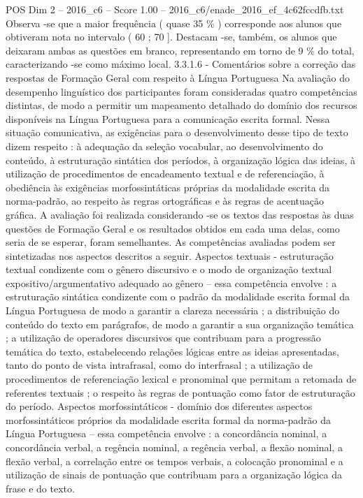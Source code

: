 \begin{textsample}{POS Dim 2 – 2016\_c6 – Score 1.00 – 2016\_c6/enade\_2016\_ef\_4c62fccdfb.txt}
Observa -se que a maior frequência ( quase 35 \% ) corresponde aos alunos que obtiveram nota no intervalo ( 60 ; 70 ].
Destacam -se, também, os alunos que deixaram ambas as questões em branco, representando em torno de 9 \% do total, caracterizando -se como máximo local. 3.3.1.6 - Comentários sobre a correção das respostas de Formação Geral com respeito à Língua Portuguesa Na avaliação do desempenho linguístico dos participantes foram consideradas quatro competências distintas, de modo a permitir um mapeamento detalhado do domínio dos recursos disponíveis na Língua Portuguesa para a comunicação escrita formal.
Nessa situação comunicativa, as exigências para o desenvolvimento desse tipo de texto dizem respeito : à adequação da seleção vocabular, ao desenvolvimento do conteúdo, à estruturação sintática dos períodos, à organização lógica das ideias, à utilização de procedimentos de encadeamento textual e de referenciação, à obediência às exigências morfossintáticas próprias da modalidade escrita da norma-padrão, ao respeito às regras ortográficas e às regras de acentuação gráfica.
A avaliação foi realizada considerando -se os textos das respostas às duas questões de Formação Geral e os resultados obtidos em cada uma delas, como seria de se esperar, foram semelhantes.
As competências avaliadas podem ser sintetizadas nos aspectos descritos a seguir.
Aspectos textuais - estruturação textual condizente com o gênero discursivo e o modo de organização textual expositivo/argumentativo adequado ao gênero – essa competência envolve : a estruturação sintática condizente com o padrão da modalidade escrita formal da Língua Portuguesa de modo a garantir a clareza necessária ; a distribuição do conteúdo do texto em parágrafos, de modo a garantir a sua organização temática ; a utilização de operadores discursivos que contribuam para a progressão temática do texto, estabelecendo relações lógicas entre as ideias apresentadas, tanto do ponto de vista intrafrasal, como do interfrasal ; a utilização de procedimentos de referenciação lexical e pronominal que permitam a retomada de referentes textuais ; o respeito às regras de pontuação como fator de estruturação do período.
Aspectos morfossintáticos - domínio dos diferentes aspectos morfossintáticos próprios da modalidade escrita formal da norma-padrão da Língua Portuguesa – essa competência envolve : a concordância nominal, a concordância verbal, a regência nominal, a regência verbal, a flexão nominal, a flexão verbal, a correlação entre os tempos verbais, a colocação pronominal e a utilização de sinais de pontuação que contribuam para a organização lógica da frase e do texto.

\end{textsample}
